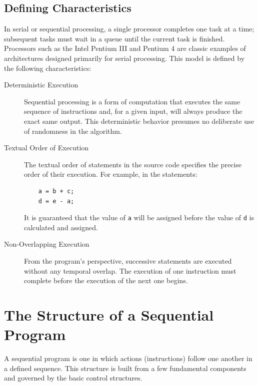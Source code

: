 \subsection{Defining Characteristics}
In serial or sequential processing, a single processor completes one task at a time; subsequent tasks must wait in a queue until the current task is finished. Processors such as the Intel Pentium III and Pentium 4 are classic examples of architectures designed primarily for serial processing. This model is defined by the following characteristics:
\begin{description}
    \item[Deterministic Execution] Sequential processing is a form of computation that executes the same sequence of instructions and, for a given input, will always produce the exact same output. This deterministic behavior presumes no deliberate use of randomness in the algorithm.
    \item[Textual Order of Execution] The textual order of statements in the source code specifies the precise order of their execution. For example, in the statements:
    \begin{verbatim}
    a = b + c;
    d = e - a;
    \end{verbatim}
    It is guaranteed that the value of \texttt{a} will be assigned before the value of \texttt{d} is calculated and assigned.
    \item[Non-Overlapping Execution] From the program's perspective, successive statements are executed without any temporal overlap. The execution of one instruction must complete before the execution of the next one begins.
\end{description}

\section{The Structure of a Sequential Program}
A sequential program is one in which actions (instructions) follow one another in a defined sequence. This structure is built from a few fundamental components and governed by the basic control structures.

